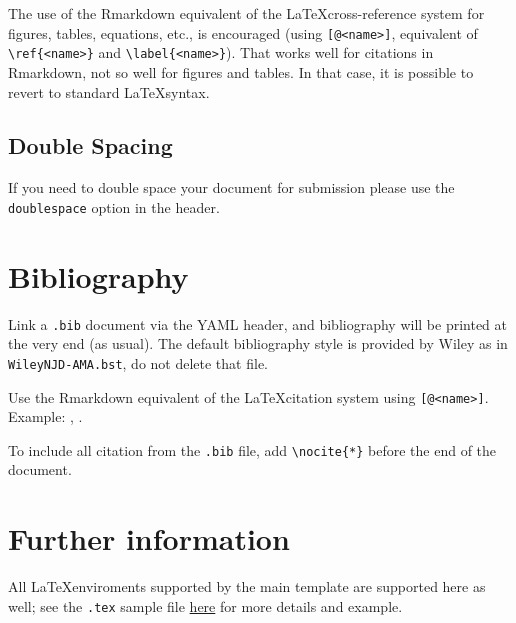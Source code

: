 \documentclass[Royal,times,sageh]{sagej}
\begin{document}
The use of the Rmarkdown equivalent of the \LaTeX cross-reference system
for figures, tables, equations, etc., is encouraged (using
\texttt{{[}@\textless{}name\textgreater{}{]}}, equivalent of
\texttt{\textbackslash{}ref\{\textless{}name\textgreater{}\}} and
\texttt{\textbackslash{}label\{\textless{}name\textgreater{}\}}). That
works well for citations in Rmarkdown, not so well for figures and
tables. In that case, it is possible to revert to standard
\LaTeX syntax.

\hypertarget{double-spacing}{%
\subsection{Double Spacing}\label{double-spacing}}

If you need to double space your document for submission please use the
\texttt{doublespace} option in the header.

\hypertarget{bibliography}{%
\section{Bibliography}\label{bibliography}}

Link a \texttt{.bib} document via the YAML header, and bibliography will
be printed at the very end (as usual). The default bibliography style is
provided by Wiley as in \texttt{WileyNJD-AMA.bst}, do not delete that
file.

Use the Rmarkdown equivalent of the \LaTeX citation system using
\texttt{{[}@\textless{}name\textgreater{}{]}}. Example:
\citep{Taylor1937}, \citep{Knupp1999, Kamm2000}.

To include all citation from the \texttt{.bib} file, add
\texttt{\textbackslash{}nocite\{*\}} before the end of the document.

\hypertarget{further-information}{%
\section{Further information}\label{further-information}}

All \LaTeX enviroments supported by the main template are supported here
as well; see the \texttt{.tex} sample file
\href{http://onlinelibrary.wiley.com/journal/10.1002/(ISSN)1097-0258/homepage/la_tex_class_file.htm}{here}
for more details and example.



\end{document}
